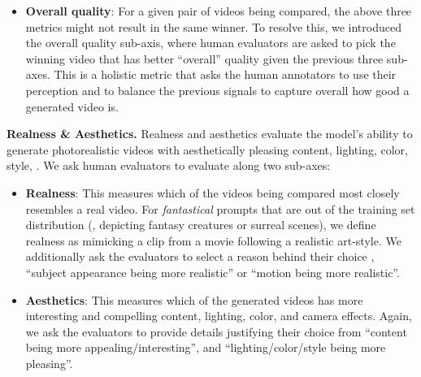 \begin{itemize}
    \item \textbf{Overall quality}:
    For a given pair of videos being compared, the above three metrics might not result in the same winner.
    To resolve this, we introduced the overall quality sub-axis, where human evaluators are asked to pick the winning video that has better ``overall'' quality given the previous three sub-axes.
    This is a holistic metric that asks the human annotators to use their perception and to balance the previous signals to capture overall how good a generated video is.

\end{itemize}

\noindent \textbf{Realness \& Aesthetics.}
Realness and aesthetics evaluate the model's ability to generate photorealistic videos with aesthetically pleasing content, lighting, color, style, \etc.
We ask human evaluators to evaluate along two sub-axes:


\begin{itemize}
    \item \textbf{Realness}:
    This measures which of the videos being compared most closely resembles a real video. For \textit{fantastical} prompts that are out of the training set distribution (\eg, depicting fantasy creatures or surreal scenes), we define realness as mimicking a clip from a movie following a realistic art-style.
    We additionally ask the evaluators to select a reason behind their choice \ie, ``subject appearance being more realistic'' or ``motion being more realistic''.
    \item \textbf{Aesthetics}:
    This measures which of the generated videos has more interesting and compelling content, lighting, color, and camera effects.
    Again, we ask the evaluators to provide details justifying their choice from ``content being more appealing/interesting'', and ``lighting/color/style being more pleasing''.
\end{itemize}


